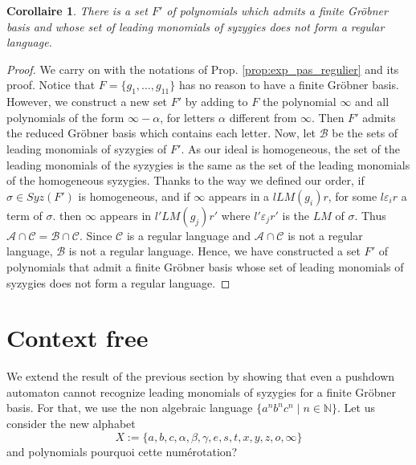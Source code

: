 \documentclass[sigconf]{acmart}
\theoremstyle{plain}
\newtheorem{cor}[lem]{Corollaire}
\theoremstyle{definition}
\theoremstyle{remark}
\newcommand{\N}{\mathbb{N}}
\newcommand{\LM}{LM}
\newcommand\fixmecc[1]{{\color{red}{\underline{\bf C:}} #1}}
\begin{document}
\begin{cor}
There is a set $F'$ of polynomials which
admits a finite Gröbner basis
and whose set of leading monomials of syzygies does not form a regular language. 
\end{cor}
\begin{proof}
We carry on with the notations of Prop. \ref{prop:exp_pas_regulier} and
its proof.
Notice that $F=\{g_1,\dots,g_{11}\}$ has no reason to have a finite Gröbner basis. However, we construct a new set $F'$ by adding to $F$ the polynomial $\infty$ and all polynomials of the form $\infty-\alpha$, for letters $\alpha$ different from $\infty$. Then $F'$ admits the reduced Gröbner basis which contains each letter.
Now, let $\mathscr{B}$ be the sets of leading monomials of syzygies of $F'$.
As our ideal is homogeneous,
the set of the
leading monomials of the syzygies
is the same as the set of the leading
monomials of the homogeneous syzygies.
Thanks to the way we defined our order,
if $\sigma \in Syz(F')$ is homogeneous,
and
if $\infty$ appears in a $l \LM(g_i) r$,
for some $l \varepsilon_i r$ 
a term of $\sigma.$ 
then 
$\infty$ appears in $l' \LM(g_j) r'$
where $l' \varepsilon_j r'$ is the $\LM$
of $\sigma.$
Thus $\mathscr{A} \cap \mathscr{C}=\mathscr{B} \cap \mathscr{C}$. Since $\mathscr{C}$ is a regular language and $\mathscr{A} \cap \mathscr{C}$ is not a regular language, $\mathscr{B}$ is not a regular language. Hence, we have constructed a set $F'$ of polynomials that admit a finite Gröbner basis whose set of leading monomials of syzygies does not form a regular language. 
\end{proof}


\section{Context free}

We extend the result of the previous section by showing that even a pushdown automaton cannot recognize leading monomials of syzygies for a finite Gröbner basis. For that, we use the non algebraic language $\{a^nb^nc^n \;|\; n \in \N\}$. Let us consider the new alphabet 
$$X:=\{a, b, c, \alpha ,\beta , \gamma, e, s, t, x, y, z, o, \infty\}$$
and polynomials \fixmecc{pourquoi cette numérotation?}
\end{document}
